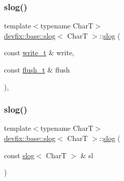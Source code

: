 \subsubsection{\texorpdfstring{slog()}{slog()}\hspace{0.1cm}{\footnotesize\ttfamily [3/5]}}
{\footnotesize\ttfamily template$<$typename CharT$>$ \\
\hyperlink{structdevfix_1_1base_1_1slog}{devfix\+::base\+::slog}$<$ CharT $>$\+::\hyperlink{structdevfix_1_1base_1_1slog}{slog} (\begin{DoxyParamCaption}\item[{const \hyperlink{structdevfix_1_1base_1_1slog_a5897ebe6b65ffd7a1845a6bca989f288}{write\+\_\+t} \&}]{write,  }\item[{const \hyperlink{structdevfix_1_1base_1_1slog_a5c957ca5d7392786ede9f813ec40fb40}{flush\+\_\+t} \&}]{flush }\end{DoxyParamCaption})\hspace{0.3cm}{\ttfamily [inline]}, {\ttfamily [explicit]}}

\mbox{\label{structdevfix_1_1base_1_1slog_a6518d5f010a788a97ce0b2ea69474b1e}} 
\subsubsection{\texorpdfstring{slog()}{slog()}\hspace{0.1cm}{\footnotesize\ttfamily [4/5]}}
{\footnotesize\ttfamily template$<$typename CharT$>$ \\
\hyperlink{structdevfix_1_1base_1_1slog}{devfix\+::base\+::slog}$<$ CharT $>$\+::\hyperlink{structdevfix_1_1base_1_1slog}{slog} (\begin{DoxyParamCaption}\item[{const \hyperlink{structdevfix_1_1base_1_1slog}{slog}$<$ CharT $>$ \&}]{sl }\end{DoxyParamCaption})\hspace{0.3cm}{\ttfamily [delete]}}

\mbox{\label{structdevfix_1_1base_1_1slog_af82a828dcb966a06214de6116a9b2f21}} 
